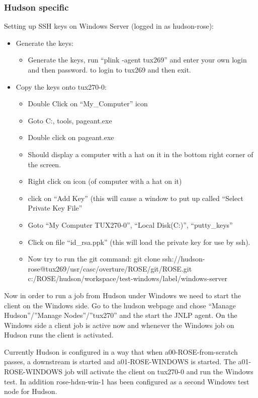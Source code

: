 \subsubsection{Hudson specific}

Setting up SSH keys on Windows Server (logged in as hudson-rose):

\begin{itemize}
\item Generate the keys:
\begin{itemize}
   \item Generate the keys, run ``plink -agent tux269'' and enter your
      own login and then password. to login to tux269 and then exit.
\end{itemize}

\item Copy the keys onto tux270-0:
\begin{itemize}
   \item Double Click on ``My\_Computer'' icon
   \item Goto C:, tools, pageant.exe
   \item Double click on pageant.exe
   \item Should display a computer with a hat on it in the bottom right 
corner of the screen.
   \item Right click on icon (of computer with a hat on it)
   \item click on ``Add Key'' (this will cause a window to put up called ``Select Private Key File''
   \item Goto ``My Computer TUX270-0'', ``Local Disk(C:)'', ``putty\_keys''
   \item Click on file ``id\_rsa.ppk''  (this will load the private  key for 
use by ssh).
   \item Now try to run the git command: git clone ssh://hudson-rose@tux269/usr/casc/overture/ROSE/git/ROSE.git c:/ROSE/hudson/workspace/test-windows/label/windows-server
\end{itemize}
\end{itemize}

Now in order to run a job from Hudson under Windows we need to start the client on the Windows side.
Go to the hudson webpage and chose ``Manage Hudson''/''Manage Nodes''/''tux270'' and the start the JNLP agent.
On the Windows side a client job is active now and whenever the Windows job on Hudson runs the client is activated.

Currently Hudson is configured in a way that when a00-ROSE-from-scratch passes, a downstream is started and a01-ROSE-WINDOWS is started. The a01-ROSE-WINDOWS job will activate the client on tux270-0 and run the Windows test. In addition rose-hdsn-win-1 has been configured as a second Windows test node for Hudson.

